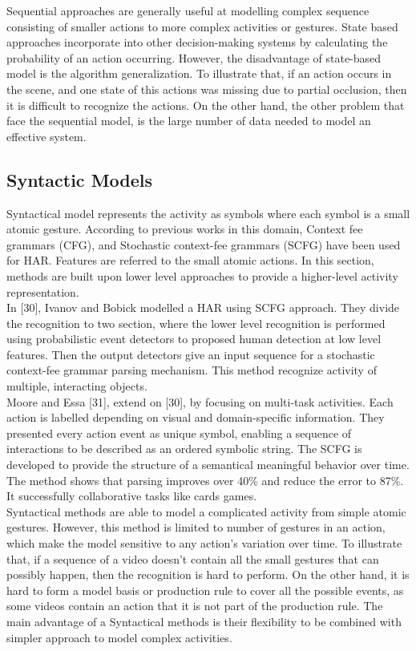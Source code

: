 Sequential approaches are generally useful at modelling complex sequence consisting of smaller actions to more complex activities or gestures. State based approaches incorporate into other decision-making systems by calculating the probability of an action occurring. However, the disadvantage of state-based model is the algorithm generalization. To illustrate that, if an action occurs in the scene, and one state of this actions was missing due to partial occlusion, then it is difficult to recognize the actions. On the other hand, the other problem that face the sequential model, is the large number of data needed to model an effective system. 

\subsection{Syntactic Models}
\hspace{5mm} Syntactical model represents the activity as symbols where each symbol is a small atomic gesture. According to previous works in this domain, Context fee grammars (CFG), and Stochastic context-fee grammars (SCFG) have been used for HAR. Features are referred to the small atomic actions. In this section, methods are built upon lower level approaches to provide a higher-level activity representation.\\

In [30], Ivanov and Bobick modelled a HAR using SCFG approach. They divide the recognition to two section, where the lower level recognition is performed using probabilistic event detectors to proposed human detection at low level features. Then the output detectors give an input sequence for a stochastic context-fee grammar parsing mechanism. This method recognize activity of multiple, interacting objects.\\

Moore and Essa [31], extend on [30], by focusing on multi-task activities. Each action is labelled depending on visual and domain-specific information. They presented every action event as unique symbol, enabling a sequence of interactions to be described as an ordered symbolic string. The SCFG is developed to provide the structure of a semantical meaningful behavior over time. The method shows that parsing improves over 40\% and reduce the error to 87\%. It successfully collaborative tasks like cards games.\\

Syntactical methods are able to model a complicated activity from simple atomic gestures. However, this method is limited to number of gestures in an action, which make the model sensitive to any action’s variation over time. To illustrate that, if a sequence of a video doesn’t contain all the small gestures that can possibly happen, then the recognition is hard to perform. On the other hand, it is hard to form a model basis or production rule to cover all the possible events, as some videos contain an action that it is not part of the production rule. The main advantage of a Syntactical methods is their flexibility to be combined with simpler approach to model complex activities.

